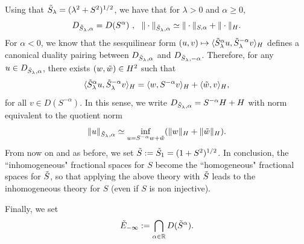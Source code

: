 \documentclass[11pt, letterpaper]{amsart}
\theoremstyle{definition}
\theoremstyle{remark}
\numberwithin{equation}{section}
\begin{document}
Using that $\Tilde{S}_\lambda =(\lambda^2+S^2)^{{1}/{2}}$, we have that for $\lambda> 0$ and    $\alpha \ge 0$,
\begin{equation*}
    D_{\Tilde{S}_\lambda,\alpha}= D(S^\alpha) \ , \ \ \|  \cdot \|_{\Tilde{S}_\lambda,\alpha} \simeq \|  \cdot \|_{S,\alpha} + \| \cdot \|_H.
\end{equation*}
For $\alpha<0$, we know that the sesquilinear form $(u,v) \mapsto \langle \Tilde{S}_\lambda^\alpha u, \Tilde{S}_\lambda^{-\alpha} v \rangle_H$ defines a canonical duality pairing between $D_{\Tilde{S}_\lambda,\alpha}$ and $D_{\Tilde{S}_\lambda,-\alpha}$. Therefore, for any $u \in D_{\Tilde{S}_\lambda,\alpha}$, there exists $(w,\Tilde{w}) \in H^2$ such that
 $$\langle \Tilde{S}_\lambda^\alpha u, \Tilde{S}_\lambda^{-\alpha} v \rangle_H = \langle w, S^{-\alpha} v \rangle_H+ \langle \Tilde{w},  v \rangle_H,$$
for all $v \in D(S^{-\alpha})$. In this sense, we write $D_{\Tilde{S}_\lambda,\alpha}=S^{-\alpha}H+H$ with norm equivalent to the quotient norm 
$$\|  u \|_{\Tilde{S}_\lambda,\alpha} \simeq \inf_{u=S^{-\alpha}w+\Tilde{w}}(\| w \|_H+\| \Tilde{w} \|_H).$$
  From now on and as before, we set $\Tilde{S}:=\Tilde{S}_1=(1+S^2)^{1/2}$. In conclusion, the ``inhomogeneous" fractional spaces for $S$ become the ``homogeneous" fractional spaces for $\Tilde{S}$, so that  applying the above theory with $\Tilde{S}$ leads to the inhomogeneous theory for $S$ (even if $S$ is non injective).



Finally, we set 
$$ \Tilde{E}_{-\infty}:= \bigcap_{\alpha \in \mathbb{R}} D(\Tilde{S}^{\alpha }) .$$
\end{document}
